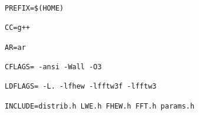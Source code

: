 \lstset{framesep=-10pt, xleftmargin=-10pt}
\begin{lstlisting}[caption={FHEW: Makefile},label={listing:3.8.1}]
PREFIX=$(HOME)

CC=g++

AR=ar

CFLAGS= -ansi -Wall -O3

LDFLAGS= -L. -lfhew -lfftw3f -lfftw3

INCLUDE=distrib.h LWE.h FHEW.h FFT.h params.h

\end{lstlisting}



